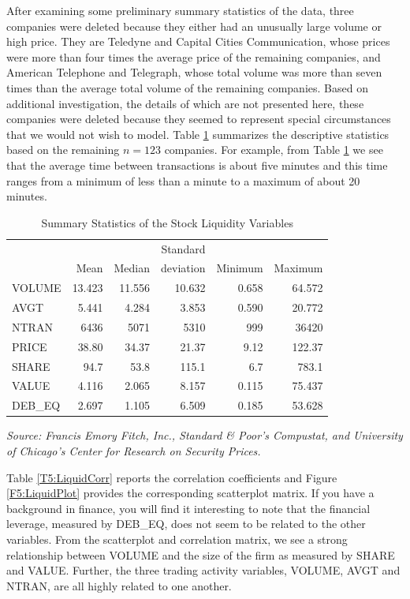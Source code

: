 After examining some preliminary summary statistics of the data,
three companies were deleted because they either had an unusually
large volume or high price. They are Teledyne and Capital Cities
Communication, whose prices were more than four times the average
price of the remaining companies, and American Telephone and
Telegraph, whose total volume was more than seven times than the
average total volume of the remaining companies. Based on additional
investigation, the details of which are not presented here, these
companies were deleted because they seemed to represent special
circumstances that we would not wish to model. Table
\ref{T5:LiquidSumStats} summarizes the descriptive statistics based
on the remaining $n=123$ companies. For example, from Table
\ref{T5:LiquidSumStats} we see that the average time between
transactions is about five minutes and this time ranges from a
minimum of less than a minute to a maximum of about 20 minutes.

\begin{table}[h]

\caption{\label{T5:LiquidSumStats} Summary Statistics of the Stock
Liquidity Variables}

\begin{tabular}{lrrrrr}
\hline
&  & & Standard &  &  \\
& Mean & Median & deviation & Minimum & Maximum \\
\hline VOLUME & 13.423 & 11.556 & 10.632 &
0.658 & 64.572 \\
AVGT & 5.441 & 4.284 & 3.853 & 0.590 &
20.772 \\
NTRAN & 6436 & 5071 & 5310 & 999 &
36420 \\
PRICE & 38.80 & 34.37 & 21.37 & 9.12 &
122.37 \\
SHARE & 94.7 & 53.8 & 115.1 & 6.7 &
783.1 \\
VALUE & 4.116 & 2.065 & 8.157 & 0.115 &
75.437 \\
DEB\_EQ & 2.697 & 1.105 & 6.509 & 0.185 & 53.628 \\ \hline
\end{tabular}

\textit{Source: Francis Emory Fitch, Inc., Standard \& Poor's
Compustat, and University of Chicago's Center for Research on
Security Prices.}

\end{table}

Table \ref{T5:LiquidCorr} reports the correlation coefficients and
Figure \ref{F5:LiquidPlot} provides the corresponding scatterplot
matrix. If you have a background in finance, you will find it
interesting to note that the financial leverage, measured by
DEB\_EQ, does not seem to be related to the other variables. From
the scatterplot and correlation matrix, we see a strong relationship
between VOLUME and the size of the firm as measured by SHARE and
VALUE. Further, the three trading activity variables, VOLUME, AVGT
and NTRAN, are all highly related to one another.

